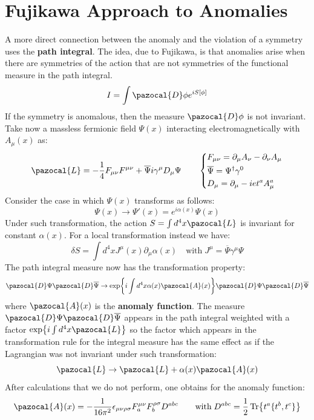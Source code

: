 \documentclass[../main.tex]{subfiles}
\begin{document}
\section{Fujikawa Approach to Anomalies}
A more direct connection between the anomaly and the violation of a symmetry uses the \textbf{path integral}. The idea, due to Fujikawa, is that anomalies arise when there are symmetries of the action that are not symmetries of the functional measure in the path integral. 
\[
I=\int\pazocal{D}\phi e^{iS[\phi]} 
\]
If the symmetry is anomalous, then the measure $\pazocal{D}\phi$ is not invariant.\\
Take now a massless fermionic field $\Psi(x)$ interacting electromagnetically with $A_\mu(x)$ as:
\[
\pazocal{L}=-\frac{1}{4}F_{\mu\nu}F^{\mu\nu}+\overline{\Psi}i\gamma^\mu D_\mu\Psi \qquad \left\{
\begin{aligned}
&F_{\mu\nu}=\partial_\mu A_\nu-\partial_\nu A_\mu\\
&\overline{\Psi}=\Psi^\dagger\gamma^0\\
&D_\mu=\partial_\mu-iet^aA_\mu^a
\end{aligned}
\right.
\]
Consider the case in which $\Psi(x)$ transforms as follows:
\[
\Psi(x)\to \Psi'(x)=e^{i\alpha(x)}\Psi(x)
\]
Under such transformation, the action $S=\int d^4x\pazocal{L}$ is invariant for constant $\alpha(x)$. For a local transformation instead we have:
\[
\delta S=\int d^4xJ^{\mu}(x)\partial_\mu\alpha(x) \quad \text{with}\;J^{\mu}=\overline{\Psi}\gamma^\mu\Psi
\]
The path integral measure now has the transformation property:
\[
\pazocal{D}\Psi\pazocal{D}\overline{\Psi}\to\exp{i\int d^4x\alpha(x)\pazocal{A}(x)}\pazocal{D}\Psi\pazocal{D}\overline{\Psi}
\]
where $\pazocal{A}(x)$ is the \textbf{anomaly function}. The measure $\pazocal{D}\Psi\pazocal{D}\overline{\Psi}$ appears in the path integral weighted with a factor $\exp{i\int d^4x\pazocal{L}}$ so the factor which appears in the transformation rule for the integral measure has the same effect as if the Lagrangian was not invariant under such transformation:
\[
\pazocal{L}\to\pazocal{L}+\alpha(x)\pazocal{A}(x)
\]
After calculations that we do not perform, one obtains for the anomaly function:
\[
\pazocal{A}(x)=-\frac{1}{16\pi^2}\epsilon_{\mu\nu\rho\sigma}F^{\mu\nu}_aF^{\rho\sigma}_bD^{abc} \qquad \text{with}\;D^{abc}=\frac{1}{2}\Tr{t^a\{t^b,t^c\}}
\]
\end{document}
